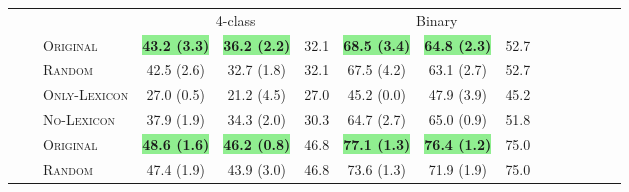 \documentclass[a4paper,11pt,twocolumn,twoside]{article}
\newcommand{\original}{\textsc{Original}\xspace}
\newcommand{\random}{\textsc{Random}\xspace}
\newcommand{\onlylex}{\textsc{Only-Lexicon}\xspace}
\newcommand{\nolex}{\textsc{No-Lexicon}\xspace}
\newcommand{\rt}[1]{\rotatebox{90}{#1}}
\begin{document}
\begin{table*}[th!]
\newcommand{\sep}{\cmidrule(r){4-6}\cmidrule(r){7-9}}
\newcommand{\sepp}{\cmidrule(r){4-4}\cmidrule(r){5-5}\cmidrule(r){6-6}\cmidrule(r){7-7}\cmidrule(r){8-8}\cmidrule(r){9-9}}


\newcommand{\bestproj}[1]{{\setlength{\fboxsep}{0pt}\colorbox{lightblue}{\textbf{#1}}}}
\newcommand{\bestmono}[1]{{\setlength{\fboxsep}{0pt}\colorbox{lightgreen}{\textbf{#1}}}}
\newcommand{\bestmt}[1]{{\setlength{\fboxsep}{0pt}\colorbox{pink}{\textbf{#1}}}}


\setlength\tabcolsep{4pt}
\renewcommand*{\arraystretch}{0.5}
\centering
\begin{tabular}{lllcccccccccccc}
\toprule
&& & \multicolumn{3}{c}{4-class} & \multicolumn{3}{c}{Binary} \\
\sep
\multirow{13}{*}{\rt{Monolingual}}
    & \multirow{4}{*}{\rt{ES}}
  		& \original  & \bestmono{43.2 \scriptsize{(3.3)}} & \bestmono{36.2 \scriptsize{(2.2)}} & 32.1  & \bestmono{68.5 \scriptsize{(3.4)}} & \bestmono{64.8 \scriptsize{(2.3)}} & 52.7 \\
		&& \random 	 & 42.5 \scriptsize{(2.6)} & 32.7 \scriptsize{(1.8)} & 32.1  & 67.5 \scriptsize{(4.2)} & 63.1 \scriptsize{(2.7)} & 52.7 \\ 
		&& \onlylex  & 27.0 \scriptsize{(0.5)} & 21.2 \scriptsize{(4.5)} & 27.0  & 45.2 \scriptsize{(0.0)} & 47.9 \scriptsize{(3.9)} & 45.2 \\ 
		&& \nolex 	 & 37.9 \scriptsize{(1.9)} & 34.3 \scriptsize{(2.0)} & 30.3  & 64.7 \scriptsize{(2.7)} & 65.0 \scriptsize{(0.9)} & 51.8 \\ 
		\sepp
	& \multirow{4}{*}{\rt{CA}}
  		& \original  & \bestmono{48.6 \scriptsize{(1.6)}} & \bestmono{46.2 \scriptsize{(0.8)}}  & 46.8  & \bestmono{77.1 \scriptsize{(1.3)}} & \bestmono{76.4 \scriptsize{(1.2)}} & 75.0  \\
		&& \random   & 47.4 \scriptsize{(1.9)} & 43.9 \scriptsize{(3.0)}  & 46.8  & 73.6 \scriptsize{(1.3)} & 71.9 \scriptsize{(1.9)} & 75.0  \\ 

\end{tabular}
\end{table*}
\end{document}

